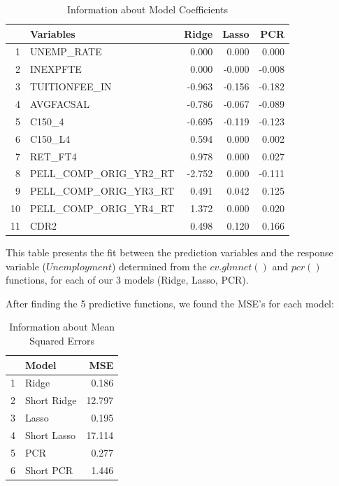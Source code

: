 \documentclass{article}\usepackage[]{graphicx}\usepackage[]{color}
\begin{document}
\begin{center}
\begin{table}[ht]
\centering
\caption{Information about Model Coefficients} 
\begin{tabular}{rlrrr}
  \hline
 & Variables & Ridge & Lasso & PCR \\ 
  \hline
1 & UNEMP\_RATE & 0.000 & 0.000 & 0.000 \\ 
  2 & INEXPFTE & 0.000 & -0.000 & -0.008 \\ 
  3 & TUITIONFEE\_IN & -0.963 & -0.156 & -0.182 \\ 
  4 & AVGFACSAL & -0.786 & -0.067 & -0.089 \\ 
  5 & C150\_4 & -0.695 & -0.119 & -0.123 \\ 
  6 & C150\_L4 & 0.594 & 0.000 & 0.002 \\ 
  7 & RET\_FT4 & 0.978 & 0.000 & 0.027 \\ 
  8 & PELL\_COMP\_ORIG\_YR2\_RT & -2.752 & 0.000 & -0.111 \\ 
  9 & PELL\_COMP\_ORIG\_YR3\_RT & 0.491 & 0.042 & 0.125 \\ 
  10 & PELL\_COMP\_ORIG\_YR4\_RT & 1.372 & 0.000 & 0.020 \\ 
  11 & CDR2 & 0.498 & 0.120 & 0.166 \\ 
   \hline
\end{tabular}
\end{table}

\end{center}

This table presents the fit between the prediction variables and the response variable ($Unemployment$) determined from the $cv.glmnet()$ and $pcr()$ functions, for each of our 3 models (Ridge, Lasso, PCR).

After finding the 5 predictive functions, we found the MSE's for each model:

\begin{center}

\begin{table}[ht]
\centering
\caption{Information about Mean Squared Errors} 
\begin{tabular}{rlr}
  \hline
 & Model & MSE \\ 
  \hline
1 & Ridge & 0.186 \\ 
  2 & Short Ridge & 12.797 \\ 
  3 & Lasso & 0.195 \\ 
  4 & Short Lasso & 17.114 \\ 
  5 & PCR & 0.277 \\ 
  6 & Short PCR & 1.446 \\ 
   \hline
\end{tabular}
\end{table}


\end{center}
\end{document}
